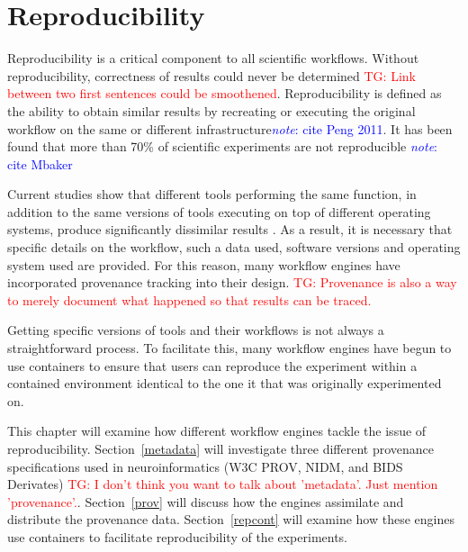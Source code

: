 \documentclass{report}
\newcommand{\note}[1]{\textcolor{blue}{\textit{note}: #1}}
\newcommand{\tristan}[1]{\textcolor{red}{TG: #1}}
\begin{document}
    \chapter{Reproducibility}\label{reproducibility}
        Reproducibility is a critical component to all scientific workflows. 
        Without reproducibility, correctness of results could never be 
        determined \tristan{Link between two first sentences could be smoothened}. Reproducibility is defined as the ability to obtain similar 
        results by 
        recreating or executing the original workflow on the same or different
        infrastructure\note{cite Peng 2011}. It has been found that more than 70\% of
        scientific experiments are not reproducible \note{cite Mbaker} 

        Current studies show that different tools 
        performing the same function, in addition to the same versions of tools 
        executing on top of different operating systems, produce significantly 
        dissimilar results \cite{bowring, gronenschild 2011, glatard 2015}. As a result, it is necessary that specific details 
        on the workflow, such a data used, software versions and operating 
        system used are provided. For this reason, many workflow engines have
        incorporated provenance tracking into their design. \tristan{Provenance is also
        a way to merely document what happened so that results can be traced.}

        Getting specific versions of tools and their workflows is not always 
        a straightforward process. To facilitate this, many workflow engines
        have begun to use containers to ensure that users can reproduce the 
        experiment within a contained environment identical to the one it that
        was originally experimented on. 

        This chapter will examine how different workflow engines tackle the 
        issue of reproducibility. Section~\ref{metadata} will investigate three 
        different provenance specifications used in neuroinformatics (W3C PROV, NIDM,
        and BIDS Derivates) \tristan{I don't think you want to talk about 'metadata'. Just
        mention 'provenance'.}. Section~\ref{prov} will discuss how the 
        engines assimilate and distribute the provenance data. 
        Section~\ref{repcont} will examine how these engines use containers to
        facilitate reproducibility of the experiments.
\end{document}
